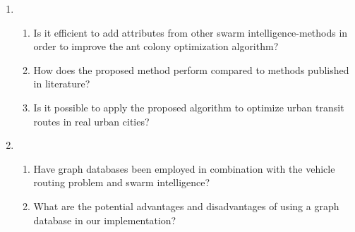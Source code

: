 \begin{enumerate}[label=\textbf{\arabic*})]
\item
    \begin{enumerate}
    \item \label{itm:2a} Is it efficient to add attributes from other swarm intelligence-methods in order to improve the ant colony optimization algorithm?
    \item \label{itm:2b1} How does the proposed method perform compared to methods published in literature?
    \item \label{itm:2c} Is it possible to apply the proposed algorithm to optimize urban transit routes in real urban cities?
    \end{enumerate}
\item
	\begin{enumerate}
    \item \label{itm:3a} Have graph databases been employed in combination with the vehicle routing problem and swarm intelligence?
	\item \label{itm:3b} What are the potential advantages and disadvantages of using a graph database in our implementation?
    \end{enumerate}
\end{enumerate}